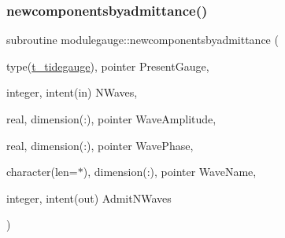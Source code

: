 \subsubsection{\texorpdfstring{newcomponentsbyadmittance()}{newcomponentsbyadmittance()}}
{\footnotesize\ttfamily subroutine modulegauge\+::newcomponentsbyadmittance (\begin{DoxyParamCaption}\item[{type(\mbox{\hyperlink{structmodulegauge_1_1t__tidegauge}{t\+\_\+tidegauge}}), pointer}]{Present\+Gauge,  }\item[{integer, intent(in)}]{N\+Waves,  }\item[{real, dimension(\+:), pointer}]{Wave\+Amplitude,  }\item[{real, dimension(\+:), pointer}]{Wave\+Phase,  }\item[{character(len=$\ast$), dimension(\+:), pointer}]{Wave\+Name,  }\item[{integer, intent(out)}]{Admit\+N\+Waves }\end{DoxyParamCaption})\hspace{0.3cm}{\ttfamily [private]}}

